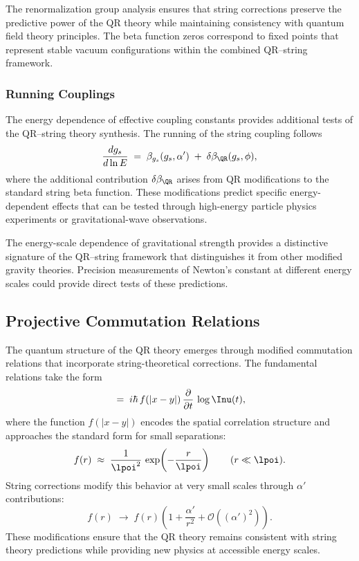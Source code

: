 The renormalization group analysis ensures that string corrections preserve the predictive power of the QR theory while maintaining consistency with quantum field theory principles. The beta function zeros correspond to fixed points that represent stable vacuum configurations within the combined QR--string framework.

\subsubsection{Running Couplings}
\label{subsubsec:running-couplings}

The energy dependence of effective coupling constants provides additional tests of the QR--string theory synthesis. The running of the string coupling follows
\begin{equation}
\frac{d g_s}{d\ln E} \;=\; \beta_{g_s}(g_s,\alpha') \;+\; \delta\beta_{\QR}(g_s,\phi),
\label{eq:running-coupling}
\end{equation}
where the additional contribution $\delta\beta_{\QR}$ arises from QR modifications to the standard string beta function. These modifications predict specific energy-dependent effects that can be tested through high-energy particle physics experiments or gravitational-wave observations.

The energy-scale dependence of gravitational strength provides a distinctive signature of the QR--string framework that distinguishes it from other modified gravity theories. Precision measurements of Newton’s constant at different energy scales could provide direct tests of these predictions.

\subsection{Projective Commutation Relations}
\label{subsec:commutation-relations}

The quantum structure of the QR theory emerges through modified commutation relations that incorporate string-theoretical corrections. The fundamental relations take the form
\begin{equation}
[\mathcal{O}(x), \mathcal{O}(y)] \;=\; i\hbar\, f(|x-y|)\, \frac{\partial}{\partial t}\, \log \Inu(t),
\label{eq:qr-commutators}
\end{equation}
where the function $f(|x-y|)$ encodes the spatial correlation structure and approaches the standard form for small separations:
\begin{equation}
f(r) \;\approx\; \frac{1}{\lpoi^2}\, \exp\!\left(-\frac{r}{\lpoi}\right) \qquad (r \ll \lpoi).
\label{eq:short-distance-commutator}
\end{equation}
String corrections modify this behavior at very small scales through $\alpha'$ contributions:
\begin{equation}
f(r) \;\longrightarrow\; f(r)\left(1 + \frac{\alpha'}{r^2} + \mathcal{O}\!\left((\alpha')^2\right)\right).
\label{eq:string-modified-commutator}
\end{equation}
These modifications ensure that the QR theory remains consistent with string theory predictions while providing new physics at accessible energy scales.

